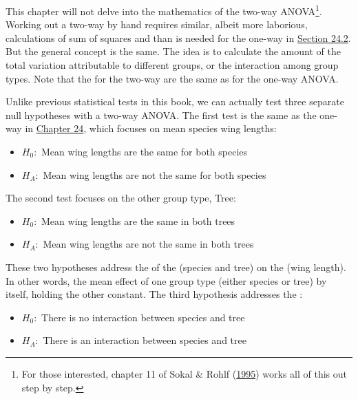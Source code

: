 \documentclass[
  openany]{krantz}
\providecommand{\tightlist}{%
  \setlength{\itemsep}{0pt}\setlength{\parskip}{0pt}}
\begin{document}
This chapter will not delve into the mathematics of the two-way ANOVA\footnote{For those interested, chapter 11 of Sokal \& Rohlf (\protect\hyperlink{ref-Sokal1995}{1995}) works all of this out step by step.}.
Working out a two-way  by hand requires similar, albeit more laborious, calculations of sum of squares and  than is needed for the one-way  in \protect\hyperlink{one-way-anova}{Section 24.2}.
But the general concept is the same.
The idea is to calculate the amount of the total variation attributable to different groups, or the interaction among group types.
Note that the  for the two-way  are the same as for the one-way ANOVA.

Unlike previous statistical tests in this book, we can actually test three separate null hypotheses with a two-way ANOVA.
The first test is the same as the one-way  in \protect\hyperlink{Chapter_24}{Chapter 24}, which focuses on mean species wing lengths:

\begin{itemize}
\tightlist
\item
  \(H_{0}:\) Mean wing lengths are the same for both species
\item
  \(H_{A}:\) Mean wing lengths are not the same for both species
\end{itemize}

The second test focuses on the other group type, Tree:

\begin{itemize}
\tightlist
\item
  \(H_{0}:\) Mean wing lengths are the same in both trees
\item
  \(H_{A}:\) Mean wing lengths are not the same in both trees
\end{itemize}

These two hypotheses address the \textbf{} of the  (species and tree) on the  (wing length).
In other words, the mean effect of one group type (either species or tree) by itself, holding the other constant.
The third hypothesis addresses the :

\begin{itemize}
\tightlist
\item
  \(H_{0}:\) There is no interaction between species and tree
\item
  \(H_{A}:\) There is an interaction between species and tree
\end{itemize}
\end{document}
